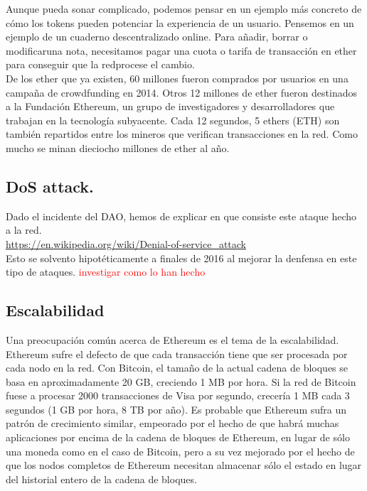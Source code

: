 \documentclass[11pt,a4paper]{article}
\begin{document}
Aunque pueda sonar complicado, podemos pensar en un ejemplo más concreto de cómo los tokens pueden potenciar la experiencia de un usuario. Pensemos en un ejemplo de un cuaderno descentralizado online. Para añadir, borrar o modificaruna nota, necesitamos pagar una cuota o tarifa de transacción en ether para conseguir que la redprocese el cambio.\\

De los ether que ya existen, 60 millones fueron comprados por usuarios en una campaña de
crowdfunding en 2014. Otros 12 millones de ether fueron destinados a la Fundación Ethereum, un grupo de investigadores y desarrolladores que trabajan en la tecnología subyacente. Cada 12 segundos, 5 ethers (ETH) son también repartidos entre los mineros que verifican transacciones en la red. Como mucho se minan dieciocho millones de ether al año.\\


\subsection{DoS attack.}
Dado el incidente del DAO, hemos de explicar en que consiste este ataque hecho a la red.		 \\
\url{https://en.wikipedia.org/wiki/Denial-of-service_attack}\\
Esto se solvento hipotéticamente a finales de 2016 al mejorar la denfensa en este tipo de ataques. \textcolor{red}{investigar como lo han hecho}

\subsection{Escalabilidad}
\label{sec:escalabilidad}

Una preocupación común acerca de Ethereum es el tema de la escalabilidad. Ethereum sufre el defecto de que cada transacción tiene que ser procesada por cada nodo en la red. Con Bitcoin, el tamaño de la actual cadena de bloques se basa en aproximadamente 20 GB, creciendo 1 MB por hora. Si la red de Bitcoin fuese a procesar 2000 transacciones de Visa por segundo, crecería 1 MB cada 3 segundos (1 GB por hora, 8 TB por año). Es probable que Ethereum sufra un patrón de crecimiento similar, empeorado por el hecho de que habrá muchas aplicaciones por encima de la cadena de bloques de Ethereum, en lugar de sólo una moneda como en el caso de Bitcoin, pero a su vez mejorado por el hecho de que los nodos completos de Ethereum necesitan almacenar sólo el estado en lugar del historial entero de la cadena de bloques.\\
\end{document}
